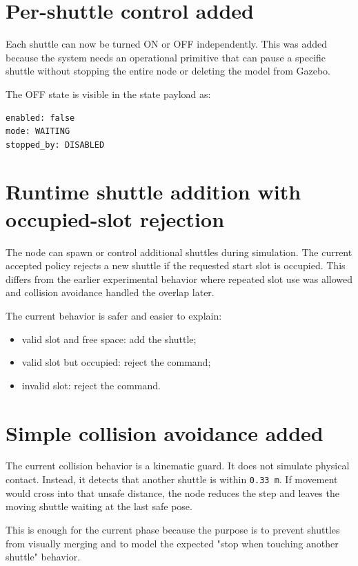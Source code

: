 \documentclass[12pt,a4paper]{report}
\begin{document}
\section{Per-shuttle control added}

Each shuttle can now be turned ON or OFF independently. This was added because
the system needs an operational primitive that can pause a specific shuttle
without stopping the entire node or deleting the model from Gazebo.

The OFF state is visible in the state payload as:

\begin{lstlisting}[style=terminalcode]
enabled: false
mode: WAITING
stopped_by: DISABLED
\end{lstlisting}

\section{Runtime shuttle addition with occupied-slot rejection}

The node can spawn or control additional shuttles during simulation. The
current accepted policy rejects a new shuttle if the requested start slot is
occupied. This differs from the earlier experimental behavior where repeated
slot use was allowed and collision avoidance handled the overlap later.

The current behavior is safer and easier to explain:

\begin{itemize}
\item valid slot and free space: add the shuttle;
\item valid slot but occupied: reject the command;
\item invalid slot: reject the command.
\end{itemize}

\section{Simple collision avoidance added}

The current collision behavior is a kinematic guard. It does not simulate
physical contact. Instead, it detects that another shuttle is within
\texttt{0.33 m}. If movement would cross into that unsafe distance, the node
reduces the step and leaves the moving shuttle waiting at the last safe pose.

This is enough for the current phase because the purpose is to prevent shuttles
from visually merging and to model the expected "stop when touching another
shuttle" behavior.
\end{document}
